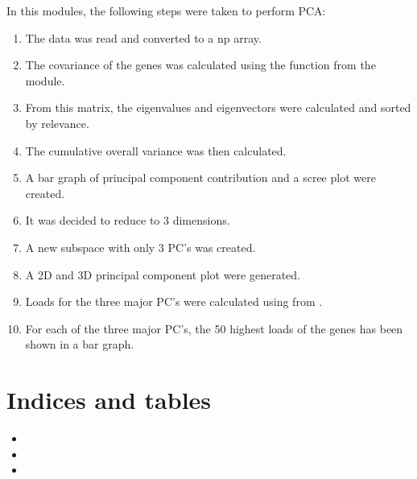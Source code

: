 \documentclass[letterpaper,10pt,english]{sphinxmanual}
\begin{document}
\sphinxAtStartPar
In this modules, the following steps were taken to perform PCA:
\begin{enumerate}
%
\item {} 
\sphinxAtStartPar
The data was read and converted to a np array.

\item {} 
\sphinxAtStartPar
The covariance of the genes was calculated using the  function from the {\hyperref[\detokenize{AssignmentPCA:module-AssignmentPCA}]{}} module.

\item {} 
\sphinxAtStartPar
From this matrix, the eigenvalues and eigenvectors were calculated and sorted by relevance.

\item {} 
\sphinxAtStartPar
The cumulative overall variance was then calculated.

\item {} 
\sphinxAtStartPar
A bar graph of principal component contribution and a scree plot were created.

\item {} 
\sphinxAtStartPar
It was decided to reduce to 3 dimensions.

\item {} 
\sphinxAtStartPar
A new subspace with only 3 PC’s was created.

\item {} 
\sphinxAtStartPar
A 2D and 3D principal component plot were generated.

\item {} 
\sphinxAtStartPar
Loads for the three major PC’s were calculated using  from {\hyperref[\detokenize{AssignmentPCA:module-AssignmentPCA}]{}}.

\item {} 
\sphinxAtStartPar
For each of the three major PC’s, the 50 highest loads of the genes has been shown in a bar graph.

\end{enumerate}


\chapter{Indices and tables}
\label{\detokenize{index:indices-and-tables}}\begin{itemize}
\item {} 
\sphinxAtStartPar
{}

\item {} 
\sphinxAtStartPar
{}

\item {} 
\sphinxAtStartPar
{}

\end{itemize}
\end{document}

